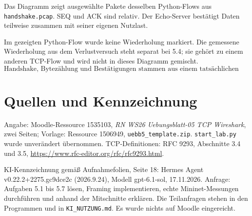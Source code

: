 \documentclass[a4paper,11pt]{article}
\newif\ifexplain
\newcommand{\explain}[1]{\ifexplain\begin{erklbox}#1\end{erklbox}\fi}
\begin{document}
Das Diagramm zeigt ausgewählte Pakete desselben Python-Flows aus
\texttt{handshake.pcap}. SEQ und ACK sind relativ. Der Echo-Server bestätigt
Daten teilweise zusammen mit seiner eigenen Nutzlast.
\begin{center}
\end{center}
Im gezeigten Python-Flow wurde keine Wiederholung markiert.
Die gemessene Wiederholung aus dem Verlustversuch steht separat bei 5.4;
sie gehört zu einem anderen TCP-Flow und wird nicht in dieses Diagramm gemischt.
\[\boxed{\text{Handshake, Bytezählung und Bestätigungen stammen aus einem tatsächlichen Flow.}}\]
\explain{Ein Pfeil ist hier ein aufgezeichnetes Segment, kein Python-Aufruf.
Das Echo enthält unser Längenpräfix und die Nachricht. Die ACKs zählen deshalb
auch die vier Präfixbytes. Ein ACK ohne Payload bewegt die eigene
Sequenznummer nicht weiter. Ausgewählte Pakete reichen für das Diagramm;
die vollständige Verbindung einschließlich Abschluss steht im Mitschnitt.}

\section*{Quellen und Kennzeichnung}
Angabe: Moodle-Ressource 1535103, \emph{RN WS26 Uebungsblatt-05 TCP Wireshark},
zwei Seiten; Vorlage: Ressource 1506949, \texttt{uebb5\_template.zip}.
\texttt{start\_lab.py} wurde unverändert übernommen.
TCP-Definitionen: RFC 9293, Abschnitte 3.4 und 3.5,
\url{https://www.rfc-editor.org/rfc/rfc9293.html}.

KI-Kennzeichnung gemäß Aufnahmefolien, Seite 18:
Hermes Agent v0.22.2+2275.gc9dce2c (2026.9.24), Modell gpt-6.1-sol,
17.11.2026. Anfrage: Aufgaben 5.1 bis 5.7 lösen, Framing implementieren,
echte Mininet-Messungen durchführen und anhand der Mitschnitte erklären.
Die Teilanfragen stehen in den Programmen und in \texttt{KI\_NUTZUNG.md}.
Es wurde nichts auf Moodle eingereicht.
\end{document}

